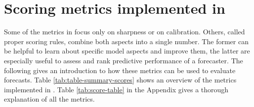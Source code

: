 \documentclass[article,shortnames]{jss}
\begin{document}
\section[metrics]{Scoring metrics implemented in }

Some of the metrics in  focus only on sharpness or on calibration. Others, called proper scoring rules, combine both aspects into a single number. The former can be helpful to learn about specific model aspects and improve them, the latter are especially useful to assess and rank predictive performance of a forecaster. The following gives an introduction to how these metrics can be used to evaluate forecasts. Table \ref{tab:table-summary-scores} shows an overview of the metrics implemented in . Table \ref{tab:score-table} in the Appendix gives a thorough explanation of all the metrics. 
\end{document}
